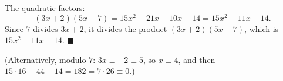 The quadratic factors:
\[(3x+2)(5x-7)=15x^2-21x+10x-14=15x^2-11x-14.\]
Since $7$ divides $3x+2$, it divides the product $(3x+2)(5x-7)$, which is $15x^2-11x-14$. $\blacksquare$

(Alternatively, modulo $7$: $3x\equiv-2\equiv5$, so $x\equiv4$, and then $15\cdot16-44-14=182=7\cdot26\equiv0$.)
